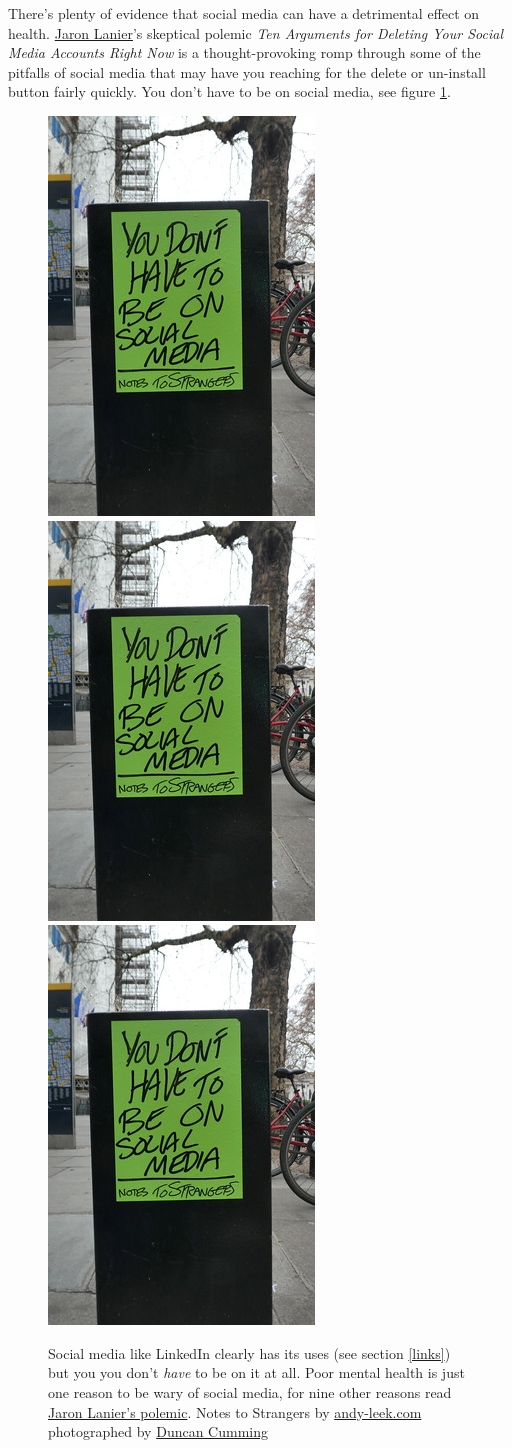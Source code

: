 \documentclass[
]{book}
\begin{document}
There's plenty of evidence that social media can have a detrimental effect on health. \href{https://en.wikipedia.org/wiki/Jaron_Lanier}{Jaron Lanier}'s skeptical polemic \emph{Ten Arguments for Deleting Your Social Media Accounts Right Now} \citep{lanier} is a thought-provoking romp through some of the pitfalls of social media that may have you reaching for the delete or un-install button fairly quickly. You don't have to be on social media, see figure \ref{fig:socialmedia-fig}.

\begin{figure}
\includegraphics[width=0.32\linewidth]{images/you-dont-have-to-be-on-social-media} \includegraphics[width=0.32\linewidth]{images/you-dont-have-to-be-on-social-media} \includegraphics[width=0.32\linewidth]{images/you-dont-have-to-be-on-social-media} \caption{Social media like LinkedIn clearly has its uses (see section \ref{links}) but you you don't \emph{have} to be on it at all. Poor mental health is just one reason to be wary of social media, for nine other reasons read \href{http://www.jaronlanier.com/tenarguments.html}{Jaron Lanier's polemic}. \citep{lanier} Notes to Strangers by \href{http://www.andy-leek.com/}{andy-leek.com} photographed by \href{https://www.flickr.com/photos/duncan/51014540593}{Duncan Cumming}}\label{fig:socialmedia-fig}
\end{figure}
\end{document}
